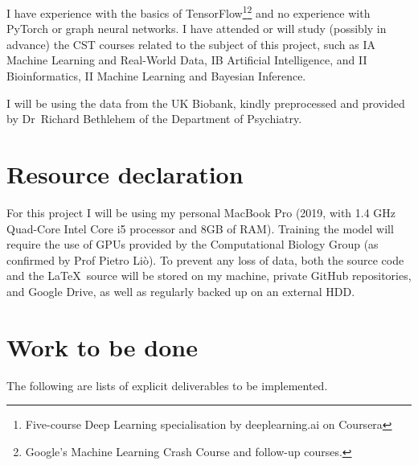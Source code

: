\documentclass[12pt,a4paper,twoside]{article}
\begin{document}
I have experience with the basics of TensorFlow\footnote{Five-course Deep Learning specialisation by deeplearning.ai on Coursera}\footnote{Google's Machine Learning Crash Course and follow-up courses.} and no experience with PyTorch or graph neural networks. I have attended or will study (possibly in advance) the CST courses related to the subject of this project, such as IA Machine Learning and Real-World Data, IB Artificial Intelligence, and II Bioinformatics, II Machine Learning and Bayesian Inference.

I will be using the data from the UK Biobank, kindly preprocessed and provided by Dr~Richard Bethlehem of the Department of Psychiatry.

\section*{Resource declaration}

For this project I will be using my personal MacBook Pro (2019, with 1.4 GHz Quad-Core Intel Core i5 processor and 8GB of RAM). Training the model will require the use of GPUs provided by the Computational Biology Group (as confirmed by Prof Pietro Liò). To prevent any loss of data, both the source code and the \LaTeX\ source will be stored on my machine, private GitHub repositories, and Google Drive, as well as regularly backed up on an external HDD.

\section*{Work to be done}
\label{section:work}


The following are lists of explicit deliverables to be implemented.
\end{document}
